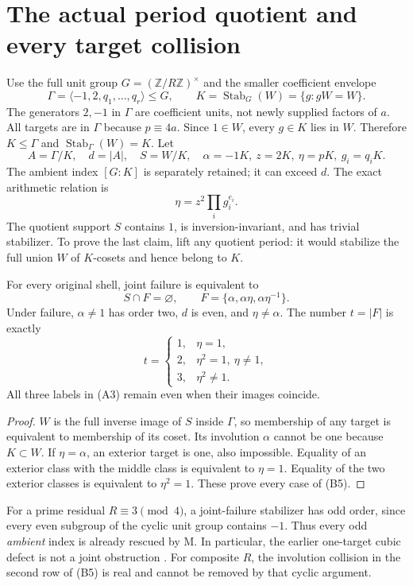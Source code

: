\section{The actual period quotient and every target collision}
Use the full unit group $G=(\mathbb Z/R\mathbb Z)^\times$ and the smaller
coefficient envelope
\[
 \Gamma=\langle-1,2,q_1,\ldots,q_r\rangle\le G,
 \qquad K=\operatorname{Stab}_G(W)=\{g:gW=W\}.             \tag{B1}
\]
The generators $2,-1$ in $\Gamma$ are coefficient units, not newly supplied
factors of $a$. All targets are in $\Gamma$ because $p\equiv4a$.
Since $1\in W$, every $g\in K$ lies in $W$. Therefore
$K\le\Gamma$ and $\operatorname{Stab}_\Gamma(W)=K$.
Let
\[
 A=\Gamma/K,\quad d=|A|,\quad S=W/K,\quad
 \alpha=-1K,\ z=2K,\ \eta=pK,\ g_i=q_iK.                 \tag{B2}
\]
The ambient index $[G:K]$ is separately retained; it can exceed $d$.
The exact arithmetic relation is
\[
 \boxed{\eta=z^2\prod_i g_i^{e_i}.}                      \tag{B3}
\]
The quotient support $S$ contains $1$, is inversion-invariant, and has
trivial stabilizer. To prove the last claim, lift any quotient period:
it would stabilize the full union $W$ of $K$-cosets and hence belong to $K$.

\begin{theorem}\label{thm:collision}
For every original shell, joint failure is equivalent to
\[
 S\cap F=\varnothing,\qquad
 F=\{\alpha,\alpha\eta,\alpha\eta^{-1}\}.               \tag{B4}
\]
Under failure, $\alpha\ne1$ has order two, $d$ is even, and $\eta\ne\alpha$.
The number $t=|F|$ is exactly
\[
 t=\begin{cases}
 1,&\eta=1,\\
 2,&\eta^2=1,\ \eta\ne1,\\
 3,&\eta^2\ne1.
 \end{cases}                                               \tag{B5}
\]
All three labels in (A3) remain even when their images coincide.
\end{theorem}
\begin{proof}
$W$ is the full inverse image of $S$ inside $\Gamma$, so membership of
any target is equivalent to membership of its coset. Its involution
$\alpha$ cannot be one because $K\subset W$. If $\eta=\alpha$, an exterior
target is one, also impossible. Equality of an exterior class with the middle
class is equivalent to $\eta=1$. Equality of the two exterior classes is
equivalent to $\eta^2=1$. These prove every case of (B5).
\end{proof}
For a prime residual $R\equiv3\pmod4$, a joint-failure stabilizer has odd
order, since every even subgroup of the cyclic unit group contains $-1$.
Thus every odd \emph{ambient} index is already rescued by M. In particular,
the earlier one-target cubic defect is not a joint obstruction
\cite[\S\S4--8]{BryanTwo}. For composite $R$, the involution collision in
the second row of (B5) is real and cannot be removed by that cyclic argument.


